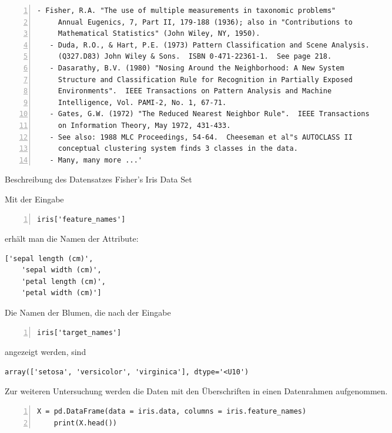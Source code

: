 \begin{code}
\begin{lstlisting}[language=MyPython, numbers=left]
   - Fisher, R.A. "The use of multiple measurements in taxonomic problems"
     Annual Eugenics, 7, Part II, 179-188 (1936); also in "Contributions to
     Mathematical Statistics" (John Wiley, NY, 1950).
   - Duda, R.O., & Hart, P.E. (1973) Pattern Classification and Scene Analysis.
     (Q327.D83) John Wiley & Sons.  ISBN 0-471-22361-1.  See page 218.
   - Dasarathy, B.V. (1980) "Nosing Around the Neighborhood: A New System
     Structure and Classification Rule for Recognition in Partially Exposed
     Environments".  IEEE Transactions on Pattern Analysis and Machine
     Intelligence, Vol. PAMI-2, No. 1, 67-71.
   - Gates, G.W. (1972) "The Reduced Nearest Neighbor Rule".  IEEE Transactions
     on Information Theory, May 1972, 431-433.
   - See also: 1988 MLC Proceedings, 54-64.  Cheeseman et al"s AUTOCLASS II
     conceptual clustering system finds 3 classes in the data.
   - Many, many more ...'
\end{lstlisting}
\caption{Beschreibung des Datensatzes Fisher's Iris Data Set}
\end{code}

Mit der Eingabe

\begin{lstlisting}[language=MyPython, numbers=left]
    iris['feature_names']
\end{lstlisting}

erhält man die Namen der Attribute:

\begin{lstlisting}[numbers=none]
    ['sepal length (cm)',
    'sepal width (cm)',
    'petal length (cm)',
    'petal width (cm)']
\end{lstlisting}

Die Namen der Blumen, die nach der Eingabe

\begin{lstlisting}[language=MyPython, numbers=left]
    iris['target_names']
\end{lstlisting}

angezeigt werden, sind

\begin{lstlisting}[numbers=none]
    array(['setosa', 'versicolor', 'virginica'], dtype='<U10')
\end{lstlisting}

Zur weiteren Untersuchung werden die Daten mit den Überschriften in einen Datenrahmen aufgenommen.

\begin{lstlisting}[language=MyPython, numbers=left]
    X = pd.DataFrame(data = iris.data, columns = iris.feature_names)
    print(X.head())
\end{lstlisting}

